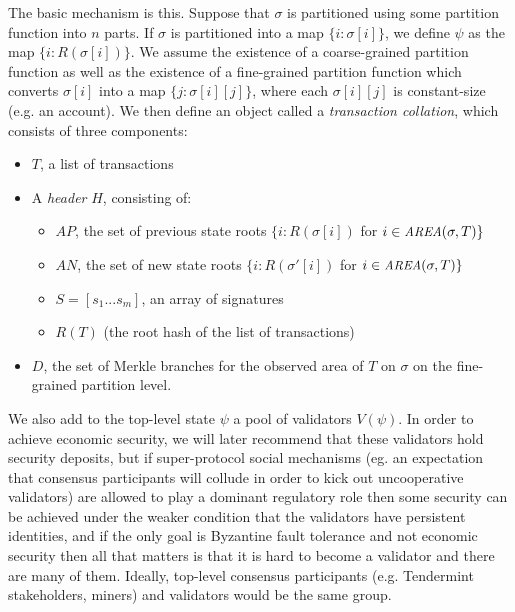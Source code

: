 \documentclass[11pt,a4paper]{article}
\makeatletter
\theoremstyle{plain}
\theoremstyle{definition}
\theoremstyle{remark}
\newcommand{\eg}{e.g.\@\xspace}
\newcommand{\makeintoafunction}[1]{\textit{\uppercase{\small #1}}}
\newcommand{\AREA}{\makeintoafunction{area}}
\makeatother
\begin{document}
The basic mechanism is this. Suppose that $\sigma$ is partitioned using some partition function into $n$ parts. If $\sigma$ is partitioned into a map $\{i: \sigma[i]\}$, we define $\psi$ as the map $\{i: R(\sigma[i])\}$. We assume the existence of a coarse-grained partition function as well as the existence of a fine-grained partition function which converts $\sigma[i]$ into a map $\{j: \sigma[i][j]\}$, where each $\sigma[i][j]$ is constant-size (\eg an account). We then define an object called a \emph{transaction collation}, which consists of three components:

\begin{itemize}
\item
$T$, a list of transactions
\item
A \emph{header} $H$, consisting of:
    \begin{itemize}
    \item
    $AP$, the set of previous state roots $\{i: R(\sigma[i])$ for $i \in \AREA(\sigma, T)\}$
    \item
    $AN$, the set of new state roots $\{i: R(\sigma'[i])$ for $i \in \AREA(\sigma, T)\}$
    \item
    $S = [s_1 ... s_m]$, an array of signatures
    \item
    $R(T)$ (the root hash of the list of transactions)
    \end{itemize}
\item
$D$, the set of Merkle branches for the observed area of $T$ on $\sigma$ on the fine-grained partition level.
\end{itemize}

We also add to the top-level state $\psi$ a pool of validators $V(\psi)$. In order to achieve economic security, we will later recommend that these validators hold security deposits, but if super-protocol social mechanisms (eg. an expectation that consensus participants will collude in order to kick out uncooperative validators) are allowed to play a dominant regulatory role then some security can be achieved under the weaker condition that the validators have persistent identities, and if the only goal is Byzantine fault tolerance and not economic security then all that matters is that it is hard to become a validator and there are many of them. Ideally, top-level consensus participants (\eg Tendermint stakeholders, miners) and validators would be the same group.
\end{document}
